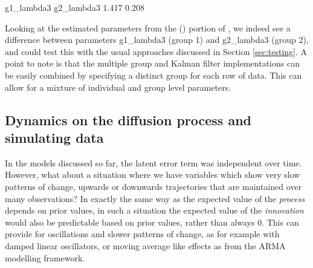 \documentclass[nojss]{jss}\usepackage[]{graphicx}\usepackage[]{color}
\begin{document}
\begin{Schunk}
\begin{Soutput}
g1_lambda3 g2_lambda3 
     1.417      0.208 
\end{Soutput}
\end{Schunk}

Looking at the estimated parameters from the  () portion of , we indeed see a difference between parameters g1\_lambda3 (group 1) and g2\_lambda3 (group 2), and could test this with the usual approaches discussed in Section \ref{sec:testing}. A point to note is that the multiple group and Kalman filter implementations can be easily combined by specifying a distinct group for each row of data. This can allow for a mixture of individual and group level parameters.

\subsection{Dynamics on the diffusion process and simulating data} \label{sec:diffusiondynamics}\nopagebreak
In the models discussed so far, the latent error term was independent over time. However, what about a situation where we have variables which show very slow patterns of change, upwards or downwards trajectories that are maintained over many observations? In exactly the same way as the expected value of the \textit{process} depends on prior values, in such a situation the expected value of the \textit{innovation} would also be predictable based on prior values, rather than always 0. This can provide for oscillations and slower patterns of change, as for example with damped linear oscillators, or moving average like effects as from the ARMA modelling framework.
\end{document}
